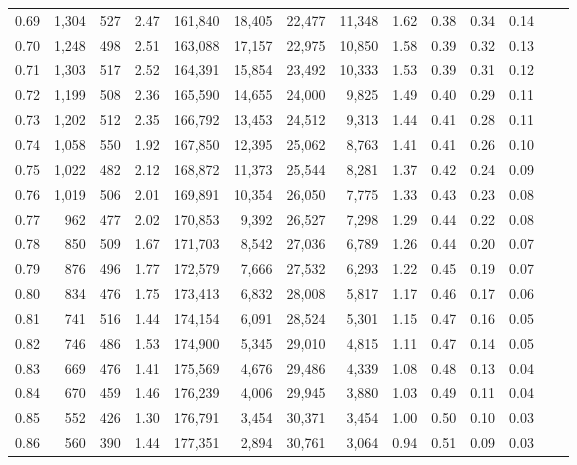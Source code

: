 \begin{tabular}{rrrrrrrrrrrrrr}
0.69 &  1,304 &  527 &    2.47 &  161,840 &   18,405 &  22,477 &  11,348 &  1.62 &  0.38 &  0.34 &      0.14 \\
0.70 &  1,248 &  498 &    2.51 &  163,088 &   17,157 &  22,975 &  10,850 &  1.58 &  0.39 &  0.32 &      0.13 \\
0.71 &  1,303 &  517 &    2.52 &  164,391 &   15,854 &  23,492 &  10,333 &  1.53 &  0.39 &  0.31 &      0.12 \\
0.72 &  1,199 &  508 &    2.36 &  165,590 &   14,655 &  24,000 &   9,825 &  1.49 &  0.40 &  0.29 &      0.11 \\
0.73 &  1,202 &  512 &    2.35 &  166,792 &   13,453 &  24,512 &   9,313 &  1.44 &  0.41 &  0.28 &      0.11 \\
0.74 &  1,058 &  550 &    1.92 &  167,850 &   12,395 &  25,062 &   8,763 &  1.41 &  0.41 &  0.26 &      0.10 \\
0.75 &  1,022 &  482 &    2.12 &  168,872 &   11,373 &  25,544 &   8,281 &  1.37 &  0.42 &  0.24 &      0.09 \\
0.76 &  1,019 &  506 &    2.01 &  169,891 &   10,354 &  26,050 &   7,775 &  1.33 &  0.43 &  0.23 &      0.08 \\
0.77 &    962 &  477 &    2.02 &  170,853 &    9,392 &  26,527 &   7,298 &  1.29 &  0.44 &  0.22 &      0.08 \\
0.78 &    850 &  509 &    1.67 &  171,703 &    8,542 &  27,036 &   6,789 &  1.26 &  0.44 &  0.20 &      0.07 \\
0.79 &    876 &  496 &    1.77 &  172,579 &    7,666 &  27,532 &   6,293 &  1.22 &  0.45 &  0.19 &      0.07 \\
0.80 &    834 &  476 &    1.75 &  173,413 &    6,832 &  28,008 &   5,817 &  1.17 &  0.46 &  0.17 &      0.06 \\
0.81 &    741 &  516 &    1.44 &  174,154 &    6,091 &  28,524 &   5,301 &  1.15 &  0.47 &  0.16 &      0.05 \\
0.82 &    746 &  486 &    1.53 &  174,900 &    5,345 &  29,010 &   4,815 &  1.11 &  0.47 &  0.14 &      0.05 \\
0.83 &    669 &  476 &    1.41 &  175,569 &    4,676 &  29,486 &   4,339 &  1.08 &  0.48 &  0.13 &      0.04 \\
0.84 &    670 &  459 &    1.46 &  176,239 &    4,006 &  29,945 &   3,880 &  1.03 &  0.49 &  0.11 &      0.04 \\
0.85 &    552 &  426 &    1.30 &  176,791 &    3,454 &  30,371 &   3,454 &  1.00 &  0.50 &  0.10 &      0.03 \\
0.86 &    560 &  390 &    1.44 &  177,351 &    2,894 &  30,761 &   3,064 &  0.94 &  0.51 &  0.09 &      0.03 \\

\end{tabular}
